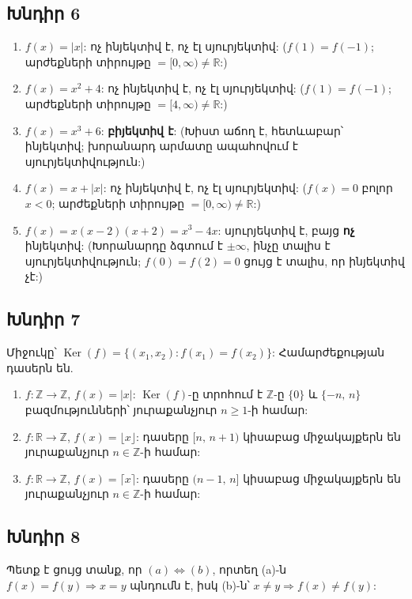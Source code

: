 \subsection*{Խնդիր 6}
\begin{enumerate}[label=(\alph*), nosep]
  \item $f(x)=|x|$: ոչ ինյեկտիվ է, ոչ էլ սյուրյեկտիվ: ($f(1)=f(-1)$; արժեքների տիրույթը $=[0,\infty)\neq\mathbb{R}$:)
  \item $f(x)=x^2+4$: ոչ ինյեկտիվ է, ոչ էլ սյուրյեկտիվ: ($f(1)=f(-1)$; արժեքների տիրույթը $=[4,\infty)\neq\mathbb{R}$:)
  \item $f(x)=x^3+6$: \textbf{բիյեկտիվ է}: (Խիստ աճող է, հետևաբար՝ ինյեկտիվ; խորանարդ արմատը ապահովում է սյուրյեկտիվություն:)
  \item $f(x)=x+|x|$: ոչ ինյեկտիվ է, ոչ էլ սյուրյեկտիվ: ($f(x)=0$ բոլոր $x<0$; արժեքների տիրույթը $=[0,\infty)\neq\mathbb{R}$:)
  \item $f(x)=x(x-2)(x+2)=x^3-4x$: սյուրյեկտիվ է, բայց \textbf{ոչ} ինյեկտիվ: (Խորանարդը ձգտում է $\pm\infty$, ինչը տալիս է սյուրյեկտիվություն; $f(0)=f(2)=0$ ցույց է տալիս, որ ինյեկտիվ չէ:)
\end{enumerate}

\subsection*{Խնդիր 7}
Միջուկը՝ $\operatorname{Ker}(f)=\{(x_1,x_2): f(x_1)=f(x_2)\}$: Համարժեքության դասերն են.
\begin{enumerate}[label=(\alph*), nosep]
  \item $f:\mathbb{Z}\to\mathbb{Z}$, $f(x)=|x|$:\; $\operatorname{Ker}(f)$-ը տրոհում է $\mathbb{Z}$-ը $\{0\}$ և $\{-n,\,n\}$ բազմությունների՝ յուրաքանչյուր $n\geq 1$-ի համար:
  \item $f:\mathbb{R}\to\mathbb{Z}$, $f(x)=\lfloor x\rfloor$:\; դասերը $[n,\,n+1)$ կիսաբաց միջակայքերն են յուրաքանչյուր $n\in\mathbb{Z}$-ի համար:
  \item $f:\mathbb{R}\to\mathbb{Z}$, $f(x)=\lceil x\rceil$:\; դասերը $(n-1,\,n]$ կիսաբաց միջակայքերն են յուրաքանչյուր $n\in\mathbb{Z}$-ի համար:
\end{enumerate}

\subsection*{Խնդիր 8}
Պետք է ցույց տանք, որ $(a)\Leftrightarrow(b)$, որտեղ (a)-ն $f(x)=f(y)\Rightarrow x=y$ պնդումն է, իսկ (b)-ն՝ $x\neq y\Rightarrow f(x)\neq f(y)$:

